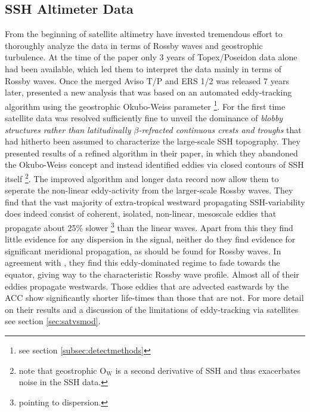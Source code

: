 \subsection{SSH Altimeter Data \cite{Chelton2007,Chelton2011}}\label{sec:hist_chelton}
From the beginning of satellite altimetry \citeauthor{Chelton2011} have invested tremendous effort to thoroughly analyze the data in terms of
Rossby waves and geostrophic turbulence. At the time of the \citet{Killworth1997a} paper only 3 years of Topex/Poseidon data alone had been available,
which led them to interpret the data mainly in terms of Rossby waves. Once the merged Aviso T/P and ERS 1/2  was released 7 years later,
\citeauthor{Chelton2007} presented a new analysis that was based on an automated eddy-tracking algorithm using the geostrophic Okubo-Weiss parameter
\footnote{see section \ref{subsec:detectmethods}}. For the first time satellite data was resolved sufficiently fine to unveil the dominance of \textit{blobby
 structures rather than latitudinally $\beta$-refracted continuous crests and troughs} that had hitherto been assumed to characterize the large-scale SSH
topography. They presented results of a refined algorithm in their \citeyear{Chelton2011} paper, in
which they abandoned the Okubo-Weiss concept and instead identified eddies via closed contours of SSH itself \footnote{note that geostrophic $\mathrm{O_W}$ is a
second derivative of SSH and thus exacerbates noise in the SSH data.}.
The improved algorithm and longer data record now allow them to seperate the non-linear eddy-activity from the larger-scale Rossby waves. They find that the vast majority of extra-tropical westward propagating SSH-variability does indeed consist of coherent, isolated, non-linear, mesoscale eddies that propagate about 25\% slower \footnote{pointing to dispersion.} than the linear waves.
Apart from this they find little evidence for any dispersion in the signal,
neither do they find evidence for significant meridional propagation, as should be found for Rossby waves. In agreement with \citet{rhines1979theoretical}, they
find this eddy-dominated regime to fade towards the equator,
giving way to the characteristic Rossby wave profile. Almost all of their eddies propagate westwards. Those eddies that are advected eastwards by \eg the ACC show significantly shorter life-times than those that are not. For more detail on their results and a discussion of the limitations of eddy-tracking via satellites see section \cref{sec:satvsmod}.

